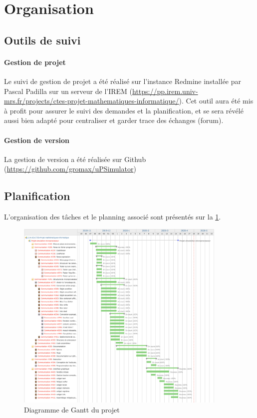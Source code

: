 \documentclass[10pt]{scrreprt} %
\begin{document}
\clearpage
\section{Organisation}
\subsection{Outils de suivi}
\paragraph{Gestion de projet}

Le suivi de gestion de projet a été réalisé sur l'instance Redmine installée par Pascal Padilla sur un serveur de l'IREM (\url{https://pp.irem.univ-mrs.fr/projects/ctes-projet-mathematiques-informatique/}). Cet outil aura été mis à profit pour assurer le suivi des demandes et la planification, et se sera révélé aussi bien adapté pour centraliser et garder trace des échanges (forum).

\paragraph{Gestion de version}
La gestion de version a été réalisée sur Github (\url{https://github.com/gromax/uPSimulator})

\subsection{Planification}
L'organisation des tâches et le planning associé sont présentés sur la \cref{fig:Gantt}.
\begin{figure}[h!]
	\centering
	\includegraphics[width=0.9\textwidth]{./Pictures/Gantt.png}
	\caption{\label{fig:Gantt}Diagramme de Gantt du projet}
\end{figure}
\end{document}
